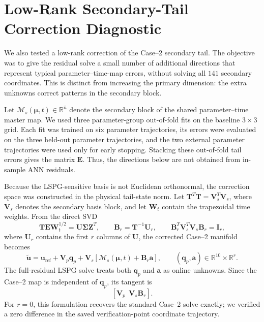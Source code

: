 \documentclass[11pt]{article}
\newcommand{\qp}{\mathbf q_p}
\newcommand{\V}{\mathbf V}
\newcommand{\uvec}{\mathbf u}
\newcommand{\mub}{\bm\mu}
\begin{document}
\section{Low-Rank Secondary-Tail Correction Diagnostic}
\label{app:case2-tail-correction}

We also tested a low-rank correction of the Case--2 secondary tail.  The
objective was to give the residual solve a small number of additional
directions that represent typical parameter--time-map errors, without solving
all \(141\) secondary coordinates.  This is distinct from increasing the
primary dimension: the extra unknowns correct patterns in the secondary block.

Let \(\mathcal M_s(\mub,t)\in\mathbb R^{\bar n}\) denote the secondary block
of the shared parameter--time master map.  We used three parameter-group
out-of-fold fits on the baseline \(3\times3\) grid.  Each fit was trained on
six parameter trajectories, its errors were evaluated on the three held-out
parameter trajectories, and the two external parameter trajectories were used
only for early stopping.  Stacking these out-of-fold tail errors gives the
matrix \(\mathbf E\).  Thus, the directions below are not obtained from
in-sample ANN residuals.

Because the LSPG-sensitive basis is not Euclidean orthonormal, the correction
space was constructed in the physical tail-state norm.  Let
\(\mathbf T^T\mathbf T=\V_s^T\V_s\), where \(\V_s\) denotes the secondary
basis block, and let \(\mathbf W_t\) contain the trapezoidal time weights.
From the direct SVD
\begin{equation}
  \mathbf T\mathbf E\mathbf W_t^{1/2}=\mathbf U\mathbf\Sigma\mathbf Z^T,
  \qquad
  \mathbf B_r=\mathbf T^{-1}\mathbf U_r,
  \qquad
  \mathbf B_r^T\V_s^T\V_s\mathbf B_r=\mathbf I_r,
  \label{eq:case2-tail-correction-basis}
\end{equation}
where \(\mathbf U_r\) contains the first \(r\) columns of \(\mathbf U\),
the corrected Case--2 manifold becomes
\begin{equation}
  \widetilde{\uvec}
  =\uvec_{\mathrm{ref}}+\V_p\qp+\V_s
  \left[\mathcal M_s(\mub,t)+\mathbf B_r\mathbf a\right],
  \qquad
  (\qp,\mathbf a)\in\mathbb R^{10}\times\mathbb R^r.
  \label{eq:case2-tail-correction-manifold}
\end{equation}
The full-residual LSPG solve treats both \(\qp\) and \(\mathbf a\) as online
unknowns.  Since the Case--2 map is independent of \(\qp\), its tangent is
\begin{equation}
  \left[\V_p\ \ \V_s\mathbf B_r\right].
  \label{eq:case2-tail-correction-tangent}
\end{equation}
For \(r=0\), this formulation recovers the standard Case--2 solve exactly;
we verified a zero difference in the saved verification-point coordinate
trajectory.
\end{document}
